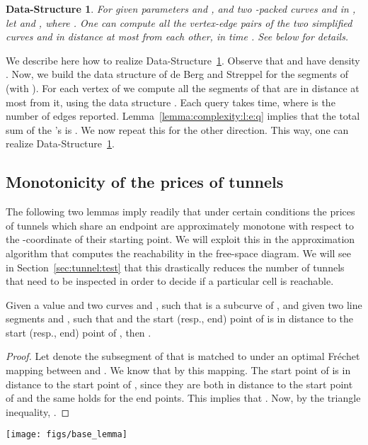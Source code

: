 \documentclass[12pt]{article}
\newtheorem{datastructure}[theorem]{Data-Structure}
\providecommand{\si}[1]{#1}
\newcommand{\secref}[1]{Section~\ref{sec:#1}}
\newcommand{\lemlab}[1]{\label{lemma:#1}}
\newcommand{\lemref}[1]{Lemma~\ref{lemma:#1}}
\newcommand{\dsref}[1]{Data-Structure~\ref{ds:#1}}
\newcommand{\dslab}[1]{\label{ds:#1}}
\newcommand{\Frechet}{Fr\'{e}c{h}e{}t\xspace}\providecommand{\Arr}{\mathop{\mathrm{\EuScript{A}}}}
\numberwithin{figure}{section}
\numberwithin{equation}{section}
\begin{document}
\begin{datastructure}
    \dslab{d:s:magic:A}For given parameters  and , and two -packed
    curves  and  in , let  and ,
    where .  One can compute all the
    vertex-edge pairs of the two simplified curves  and  in
    distance at most  from each other, in time . See below for details.
\end{datastructure}








We describe here how to realize \dsref{d:s:magic:A}.  Observe that
 and  have density .  Now, we build the
data structure of \si{de Berg} and Streppel \cite{bs-arsbsp-06} for
the segments of  (with ). For each vertex of  we
compute all the segments of  that are in distance at most
 from it, using the data structure \cite{bs-arsbsp-06}. Each
query takes  time, where  is the number of
edges reported.  \lemref{complexity:l:e:q} implies that the total sum
of the 's is .  We now repeat this for the other
direction. This way, one can realize \dsref{d:s:magic:A}.




\subsection{Monotonicity of the prices of tunnels}

The following two lemmas imply readily that under certain conditions
the prices of tunnels which share an endpoint are approximately
monotone with respect to the -coordinate of their starting
point. We will exploit this in the approximation algorithm that
computes the reachability in the free-space diagram. We will see in
\secref{tunnel:test} that this drastically reduces the number of
tunnels that need to be inspected in order to decide if a particular
cell is reachable.

\begin{lemma}\lemlab{monotone:shortcut:base}Given a value  and two curves  and
    , such that  is a subcurve of ,
    and given two line segments  and , such
    that  and the start
    (resp., end) point of  is in distance  to the
    start (resp., end) point of , then
    .
\end{lemma}




\noindent
\begin{minipage}{0.8\textwidth}
    \begin{proof}
        Let  denote the subsegment of  that is
        matched to  under an optimal \Frechet mapping
        between  and .  We know that
         by this mapping.  The
        start point of  is in distance  to the
        start point of , since they are both in distance
         to the start point of  and the same holds
        for the end points. This implies that
        .  Now, by the
        triangle inequality, .
    \end{proof}
\end{minipage}\begin{minipage}{0.19\textwidth}
    \hfill {\texttt{[image: figs/base\_lemma]}}
\end{minipage}
\end{document}
